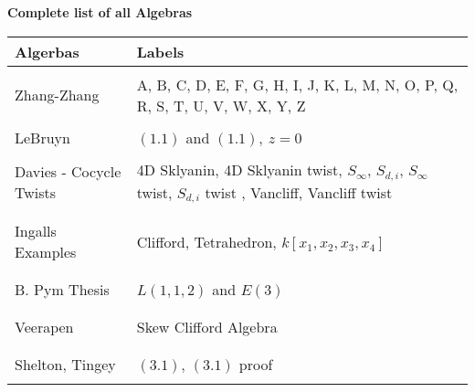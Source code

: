 \documentclass[12]{article}
\begin{document}
\pagebreak

\begin{center}
\textbf{\Large{Complete list of all Algebras}}
\end{center}
\begin{longtable}[c]{|p{3.75cm}|p{6.75cm}|}
\toprule
 Algerbas & Labels \\ 
\endfirsthead 
  \hline
\\ Zhang-Zhang & A, B, C, D, E, F, G, H, I, J, K, L, M, N, O, P, Q, R, S, T, U, V, W, X, Y, Z \\ \\
\hline
LeBruyn & $(1.1)$ and $(1.1), \ z=0$\\
\hline
\\ Davies - Cocycle Twists & 4D Sklyanin, 4D Sklyanin twist, $S_\infty	$, $S_{d,i}$, $S_\infty$ twist, $S_{d,i}$ twist	, Vancliff, Vancliff twist \\	\\
\hline
\\ Ingalls Examples & Clifford, Tetrahedron, $k[x_1,x_2,x_3,x_4]$\\ \\
\hline
\\ B. Pym Thesis & $L(1,1,2)$ and $E(3)$ \\ \\
\hline
\\ Veerapen & Skew Clifford Algebra \\ \\
\hline
\\ Shelton, Tingey & $( 3.1 )$, $(3.1)$ proof \\ \\	
\bottomrule
\end{longtable}

\pagebreak
\end{document}
